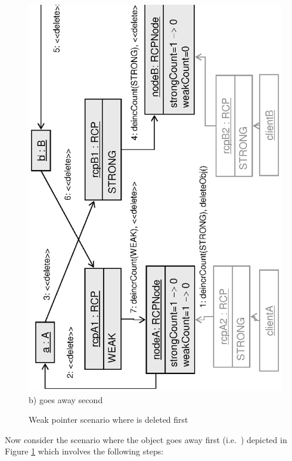 \documentclass[pdf,ps2pdf,11pt]{SANDreport}
\begin{document}
{\begin{figure}
\begin{center}
\includegraphics*[angle=270,scale=0.65]{CircularRCP_A_B_ClientB_2}
\\[2ex] b) {} goes away second \\[3ex]
\end{center}
\caption{
\label{fig:CircularRCP_A_B_ClientB}
Weak pointer scenario where {} is deleted first  }
\end{figure}
\esinglespace}


Now consider the scenario where the {} object goes away
first (i.e.\ {}) depicted in Figure
{}\ref{fig:CircularRCP_A_B_ClientB} which involves the following
steps:
\end{document}
